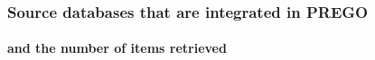 \documentclass{beamer}
\begin{document}
   \begin{frame}
      \frametitle{Source databases that are integrated in PREGO }
      \framesubtitle{and the number of items retrieved}


\end{frame}
\end{document}

